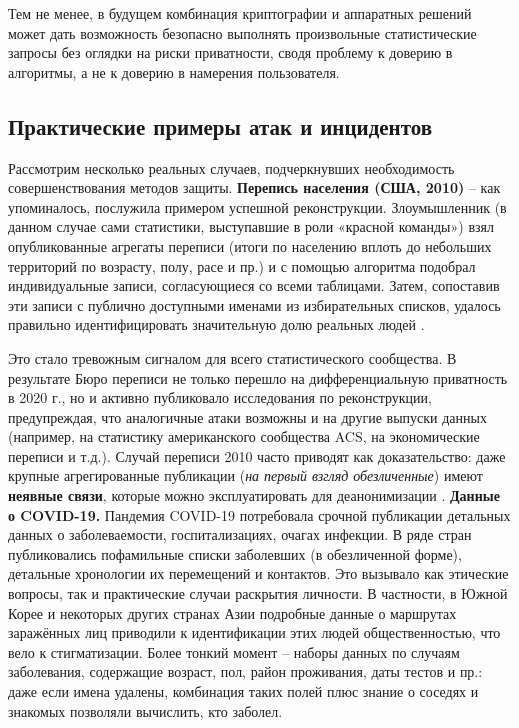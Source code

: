Тем не менее, в будущем комбинация
криптографии и аппаратных решений может дать возможность безопасно выполнять произвольные статистические запросы без
оглядки на риски приватности, сводя проблему к доверию в алгоритмы, а не к доверию в намерения пользователя.

\subsection{Практические примеры атак и инцидентов}
Рассмотрим несколько реальных случаев, подчеркнувших необходимость совершенствования методов защиты. \textbf{Перепись
населения (США, 2010)} – как упоминалось, послужила примером успешной реконструкции. Злоумышленник (в данном случае сами
статистики, выступавшие в роли «красной команды») взял опубликованные агрегаты переписи (итоги по населению вплоть до
небольших территорий по возрасту, полу, расе и пр.) и с помощью алгоритма подобрал индивидуальные записи, согласующиеся
со всеми таблицами. Затем, сопоставив эти записи с публично доступными именами из избирательных списков, удалось
правильно идентифицировать значительную долю реальных людей \autocite{cornell-edu}.

Это стало тревожным сигналом для
всего статистического сообщества. В результате Бюро переписи не только перешло на дифференциальную приватность в 2020
г., но и активно публиковало исследования по реконструкции, предупреждая, что аналогичные атаки возможны и на другие
выпуски данных (например, на статистику американского сообщества ACS, на экономические переписи и т.д.). Случай переписи
2010 часто приводят как доказательство: даже крупные агрегированные публикации (\textit{на первый взгляд обезличенные})
имеют \textbf{неявные связи}, которые можно эксплуатировать для деанонимизации \autocite{cornell-edu}. \textbf{Данные о
COVID-19.} Пандемия COVID-19 потребовала срочной публикации детальных данных о заболеваемости, госпитализациях, очагах
инфекции. В ряде стран публиковались пофамильные списки заболевших (в обезличенной форме), детальные хронологии их
перемещений и контактов. Это вызывало как этические вопросы, так и практические случаи раскрытия личности. В частности,
в Южной Корее и некоторых других странах Азии подробные данные о маршрутах заражённых лиц приводили к идентификации этих
людей общественностью, что вело к стигматизации. Более тонкий момент – наборы данных по случаям заболевания, содержащие
возраст, пол, район проживания, даты тестов и пр.: даже если имена удалены, комбинация таких полей плюс знание о соседях
и знакомых позволяли вычислить, кто заболел.

